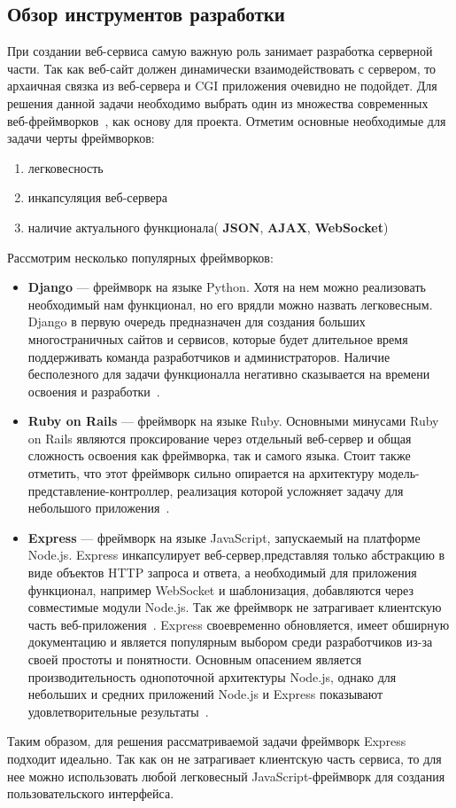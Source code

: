 \subsection{Обзор инструментов разработки}
При создании веб-сервиса самую важную роль занимает разработка серверной части. Так как веб-сайт должен динамически взаимодействовать с сервером, то архаичная связка из веб-сервера и CGI приложения очевидно не подойдет. Для решения данной задачи необходимо выбрать один из множества современных веб-фреймворков~\autocite{wiki}, как основу для проекта. Отметим основные необходимые для задачи черты фреймворков:
 \begin{enumerate}
 	\item легковесность
 	\item инкапсуляция веб-сервера
 	\item наличие актуального функционала( \textbf{JSON}, \textbf{AJAX}, \textbf{WebSocket})
 \end{enumerate}
Рассмотрим несколько популярных фреймворков:
 \begin{itemize}
 	\item \textbf{Django} --- фреймворк на языке Python. Хотя на нем можно реализовать необходимый нам функционал, но его врядли можно назвать легковесным. Django в первую очередь предназначен для создания больших многостраничных сайтов и сервисов, которые будет длительное время поддерживать команда разработчиков и администраторов. Наличие бесполезного для задачи функционалла негативно сказывается на времени освоения и разработки~\autocite{django}.  
 	\item \textbf{Ruby on Rails} --- фреймворк на языке Ruby. Основными минусами Ruby on Rails являются проксирование через отдельный веб-сервер и общая сложность освоения как фреймворка, так и самого языка. Стоит также отметить, что этот фреймворк сильно опирается на архитектуру модель-представление-контроллер, реализация которой усложняет задачу для небольшого приложения~\autocite{ruby}.  
 	\item \textbf{Express} --- фреймворк на языке JavaScript, запускаемый на платформе Node.js. Express инкапсулирует веб-сервер,представляя только абстракцию в виде объектов HTTP запроса и ответа, а необходимый для приложения функционал, например WebSocket и шаблонизация, добавляются через совместимые модули Node.js. Так же фреймворк не затрагивает клиентскую часть веб-приложения~\autocite{express}. Express своевременно обновляется, имеет обширную документацию и является популярным выбором среди разработчиков из-за своей простоты и понятности. Основным опасением является производительность однопоточной архитектуры Node.js, однако для небольших и средних приложений Node.js и Express показывают удовлетворительные результаты~\autocite{Kai14}.
 \end{itemize}
Таким образом, для решения рассматриваемой задачи фреймворк Express подходит идеально. Так как он не затрагивает клиентскую часть сервиса, то для нее можно использовать любой легковесный JavaScript-фреймворк для создания пользовательского интерфейса.

